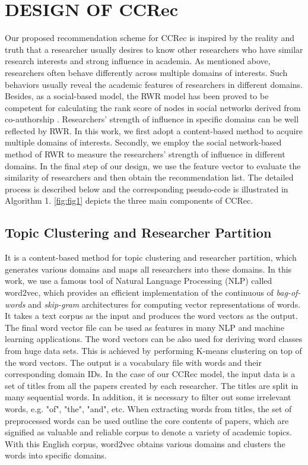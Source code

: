 \section*{DESIGN OF CCRec}
Our proposed recommendation scheme for CCRec is inspired by the reality and truth that a researcher usually desires to know other researchers who have similar research interests and strong influence in academia. As mentioned above, researchers often behave differently across multiple domains of interests. Such behaviors usually reveal the academic features of researchers in different domains. Besides, as a social-based model, the RWR model has been proved to be competent for calculating the rank score of nodes in social networks derived from co-authorship \cite{li2014acrec}. Researchers' strength of influence in specific domains can be well reflected by RWR. In this work, we first adopt a content-based method to acquire multiple domains of interests. Secondly, we employ the social network-based method of RWR to measure the researchers' strength of influence in different domains. In the final step of our design, we use the feature vector to evaluate the similarity of researchers and then obtain the recommendation list. The detailed process is described below and the corresponding pseudo-code is illustrated in Algorithm 1. \autoref{fig:fig1} depicts the three main components of CCRec.


\subsection*{Topic Clustering and Researcher Partition}
It is a content-based method for topic clustering and researcher partition, which generates various domains and maps all researchers into these domains. In this work, we use a famous tool of Natural Language Processing (NLP) called word2vec, which provides an efficient implementation of the continuous of \emph{bag-of-words} and \emph{skip-gram} architectures for computing vector representations of words. It takes a text corpus as the input and produces the word vectors as the output. The final word vector file can be used as features in many NLP and machine learning applications. The word vectors can be also used for deriving word classes from huge data sets. This is achieved by performing K-means clustering on top of the word vectors. The output is a vocabulary file with words and their corresponding domain IDs. In the case of our CCRec model, the input data is a set of titles from all the papers created by each researcher. The titles are split in many sequential words. In addition, it is necessary to filter out some irrelevant words, e.g. "of", "the", "and", etc. When extracting words from titles, the set of preprocessed words can be used outline the core contents of papers, which are signified as valuable and reliable corpus to denote a variety of academic topics. With this English corpus, word2vec obtains various domains and clusters the words into specific domains.

